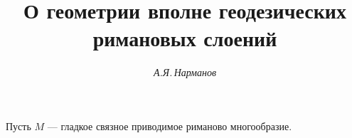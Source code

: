 









\newcommand{\tts}[1]{}







 


\setcounter{page}{26}












\author{\it А.Я.\,Нарманов}




\title{О геометрии вполне геодезических римановых слоений}





\date{}




\pagestyle{plain} %







\maketitle


\label{begin}








Пусть $M$ --- гладкое связное приводимое риманово многообразие. 


